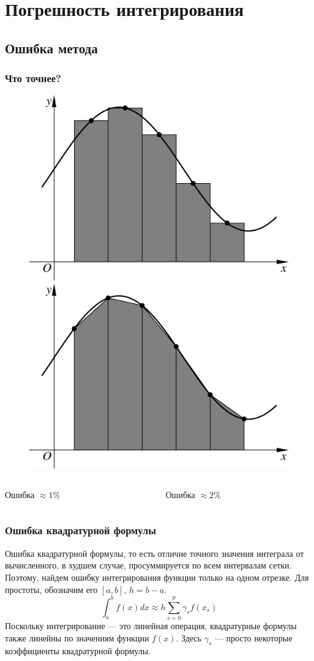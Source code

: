 \documentclass[aspectratio=169,unicode]{beamer}
\begin{document}
\section{Погрешность интегрирования}
\subsection{Ошибка метода}
\begin{frame}
\frametitle{Что точнее?}
	\begin{figure}%
	\includegraphics[width=0.5\columnwidth]{rect.pdf}%
	\includegraphics[width=0.5\columnwidth]{trap.pdf}%
	\end{figure}
	\pause

	\begin{columns}[c]
	\begin{column}{0.5\textwidth}
	\centering
	Ошибка $\approx 1\%$
	\end{column}
	\begin{column}{0.5\textwidth}
	\centering
	Ошибка $\approx 2\%$
	\end{column}
	\end{columns}
\end{frame}

\begin{frame}
\frametitle{Ошибка квадратурной формулы}
	Ошибка квадратурной формулы, то есть отличие точного значения интеграла от вычисленного, в худшем случае,
	просуммируется по всем интервалам сетки. Поэтому, найдем ошибку интегрирования функции только на одном отрезке.
	Для простоты, обозначим его $[a,b], \, h = b-a$.
	\[
	\int_a^b f(x) dx \approx h \sum_{s=0}^p \gamma_s f(x_s)
	\]
	\pause
	Поскольку интегрирование --- это линейная операция,
	квадратурные формулы также линейны по значениям функции $f(x)$. Здесь $\gamma_s$ --- просто некоторые
	коэффициенты квадратурной формулы.
\end{frame}
\end{document}
